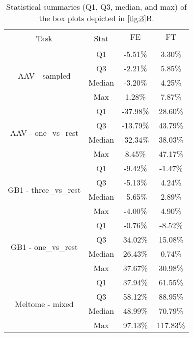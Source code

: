 \begin{table}
	\caption{\centering Statistical summaries (Q1, Q3, median, and max) of the box plots depicted in \autoref{fig:3}B.}
	\label{tab:box}
	\centering
	\renewcommand{\arraystretch}{1.5}
	\begin{tabular}{cccc}
	\toprule
	\multicolumn{1}{c}{\multirow{2}{*}{Task}} & \multicolumn{1}{c}{\multirow{2}{*}{Stat}} & \multicolumn{1}{c}{FE} & FT \\
	\multicolumn{1}{c}{} & \multicolumn{1}{c}{} & \multicolumn{1}{c}{} & \\
	\midrule
	\multirow{4}{*}{AAV - sampled} & Q1 & -5.51\% & 3.30\% \\
	 & Q3 & -2.21\% & 5.85\% \\
	 & Median & -3.20\% & 4.25\% \\
	 & Max & 1.28\% & 7.87\% \\
	\hline
	\multirow{4}{*}{AAV - one\_vs\_rest} & Q1 & -37.98\% & 28.60\% \\
	 & Q3 & -13.79\% & 43.79\% \\
	 & Median & -32.34\% & 38.03\% \\
	 & Max & 8.45\% & 47.17\% \\
	\hline
	\multirow{4}{*}{GB1 - three\_vs\_rest} & Q1 & -9.42\% & -1.47\% \\
	 & Q3 & -5.13\% & 4.24\% \\
	 & Median & -5.65\% & 2.89\% \\
	 & Max & -4.00\% & 4.90\% \\
	\hline
	\multirow{4}{*}{GB1 - one\_vs\_rest} & Q1 & -0.76\% & -8.52\% \\
	 & Q3 & 34.02\% & 15.08\% \\
	 & Median & 26.43\% & 0.74\% \\
	 & Max & 37.67\% & 30.98\% \\
	\hline
	\multirow{4}{*}{Meltome - mixed} & Q1 & 37.94\% & 61.55\% \\
	 & Q3 & 58.12\% & 88.95\% \\
	 & Median & 48.99\% & 70.79\% \\
	 & Max & 97.13\% & 117.83\% \\
	\hline
	\end{tabular}
\end{table}
